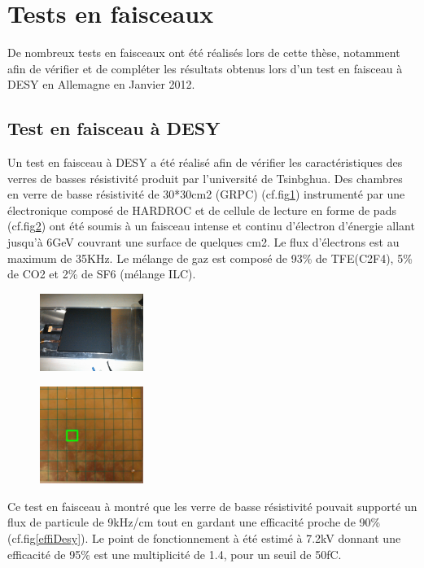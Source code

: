 \section{Tests en faisceaux}
De nombreux tests en faisceaux ont été réalisés lors de cette thèse, notamment afin de vérifier et de compléter les résultats obtenus lors d'un test en faisceau à DESY en Allemagne en Janvier 2012.
\subsection{Test en faisceau à DESY}
Un test en faisceau à DESY \cite{Haddad:2012fx} a été réalisé afin de vérifier les caractéristiques des verres de basses résistivité produit par l'université de Tsinbghua. Des chambres en verre de basse résistivité de 30*30cm2 (GRPC) (cf.fig\ref{chambre}) instrumenté par une électronique composé de HARDROC et de cellule de lecture en forme de pads (cf.fig\ref{cellule}) ont été soumis à un faisceau intense et continu d'électron d'énergie allant jusqu'à 6GeV couvrant une surface de quelques cm2. Le flux d'électrons est au maximum de 35KHz. Le mélange de gaz est composé de 93\% de TFE(C2F4), 5\% de CO2 et 2\% de SF6 (mélange ILC).
\begin{figure}[ht!]
	\centering
	\includegraphics[width=0.3\textwidth]{GLA/chambre.png}
	\label{chambre}
\end{figure}
\begin{figure}[ht!]
	\centering
	\includegraphics[width=0.3\textwidth]{GLA/cellules.png}
	\label{cellule}
\end{figure}

Ce test en faisceau à montré que les verre de basse résistivité pouvait supporté un flux de particule de 9kHz/cm tout en gardant une efficacité proche de 90\% (cf.fig\ref{effiDesy}). Le point de fonctionnement à été estimé à 7.2kV donnant une efficacité de 95\% est une multiplicité de 1.4, pour un seuil de 50fC. 

